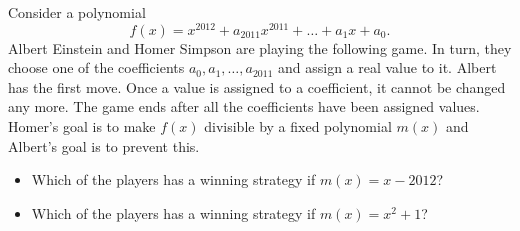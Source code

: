 Consider a polynomial
\[f(x)=x^{2012}+a_{2011}x^{2011}+\dots+a_1x+a_0.\]
Albert Einstein and Homer Simpson are playing the following game. In turn, they choose one of the coefficients \(a_0,a_1,\dots,a_{2011}\) and assign a real value to it. Albert has the first move. Once a value is assigned to a coefficient, it cannot be changed any more. The game ends after all the coefficients have been assigned values.
Homer's goal is to make \(f(x)\) divisible by a fixed polynomial \(m(x)\) and Albert's goal is to prevent this.\begin{itemize}

\item[(a)] Which of the players has a winning strategy if \(m(x)=x-2012\)?
\item[(b)] Which of the players has a winning strategy if \(m(x)=x^2+1\)?
\end{itemize}
